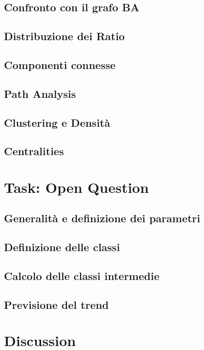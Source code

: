 \documentclass[sigchi]{acmart}
\begin{document}
\subsection{Confronto con il grafo BA}


\subsection{Distribuzione dei Ratio}


\subsection{Componenti connesse}


\subsection{Path Analysis}


\subsection{Clustering e Densità}


\subsection{Centralities}


\section{Task: Open Question}


\subsection{Generalità e definizione dei parametri}


\subsection{Definizione delle classi}


\subsection{Calcolo delle classi intermedie}


\subsection{Previsione del trend}


\section{Discussion}




\end{document}
